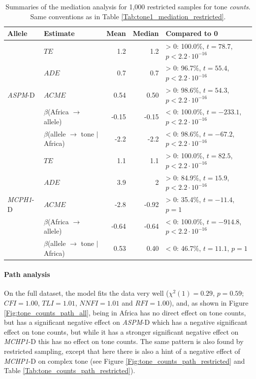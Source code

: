 \documentclass[twoside,onecolumn]{article}
\begin{document}
\begin{table}[h]
  \caption{Summaries of the mediation analysis for 1,000 restricted samples for tone \textit{counts}. Same conventions as in Table \ref{Tab:tone1_mediation_restricted}.}
  \label{Tab:tone_counts_mediation_restricted}
  \centering
  \begin{tabular}{|l|l|r|r|l|}
    \toprule
    \textbf{Allele} & \textbf{Estimate} & \textbf{Mean} & \textbf{Median} & \textbf{Compared to 0} \\
    \midrule
    \multirow{5}{*}{\textit{ASPM}-D} & $TE$ & 1.2 & 1.2 & > 0: 100.0\%, $t = 78.7$, $p < 2.2\cdot10^{-16}$ \\
    & $ADE$ & 0.7 & 0.7 & > 0: 96.7\%, $t = 55.4$, $p < 2.2\cdot10^{-16}$ \\
    & $ACME$ & 0.54 & 0.50 & > 0: 98.6\%, $t = 54.3$, $p < 2.2\cdot10^{-16}$ \\
    & $\beta$(Africa $\rightarrow$ allele) & -0.15 &  -0.15 & < 0: 100.0\%, $t = -233.1$, $p < 2.2\cdot10^{-16}$ \\
    & $\beta$(allele $\rightarrow$ tone $\mid$ Africa) & -2.2 & -2.2 & < 0: 98.6\%, $t =  -67.2$, $p < 2.2\cdot10^{-16}$ \\
    \midrule
    \multirow{5}{*}{\textit{MCPH1}-D} & $TE$ & 1.1 & 1.1 & > 0: 100.0\%, $t = 82.5$, $p < 2.2\cdot10^{-16}$ \\
    & $ADE$ & 3.9 & 2 & > 0: 84.9\%, $t = 15.9$, $p < 2.2\cdot10^{-16}$ \\
    & $ACME$ & -2.8 & -0.92 & > 0: 35.4\%, $t = -11.4$, $p = 1$ \\
    & $\beta$(Africa $\rightarrow$ allele) & -0.64 & -0.64 & < 0: 100.0\%, $t = -914.8$, $p < 2.2\cdot10^{-16}$ \\
    & $\beta$(allele $\rightarrow$ tone $\mid$ Africa) & 0.53 & 0.40 & < 0: 46.7\%, $t = 11.1$, $p = 1$ \\
    \bottomrule
  \end{tabular}
\end{table}


\paragraph{Path analysis}

On the full dataset, the model fits the data very well ($\chi^2(1) = 0.29$, $p = 0.59$; $CFI=1.00$, $TLI=1.01$, $NNFI=1.01$ and $RFI=1.00$), and, as shown in Figure \ref{Fig:tone_counts_path_all}, being in Africa has no direct effect on tone counts, but has a significant negative effect on \textit{ASPM}-D which has a negative significant effect on tone counts, but while it has a stronger significant negative effect on \textit{MCHP1}-D this has no effect on tone counts.
The same pattern is also found by restricted sampling, except that here there is also a hint of a negative effect of \textit{MCHP1}-D on complex tone (see Figure \ref{Fig:tone_counts_path_restricted} and Table \ref{Tab:tone_counts_path_restricted}).
\end{document}
